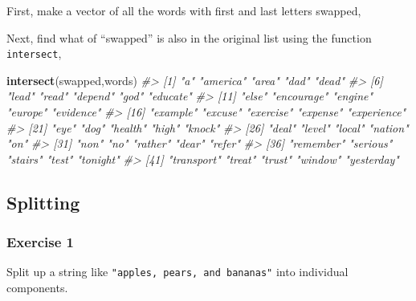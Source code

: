\documentclass[]{book}
\newenvironment{Shaded}{\begin{snugshade}}{\end{snugshade}}
\newcommand{\CharTok}[1]{\textcolor[rgb]{0.31,0.60,0.02}{#1}}
\newcommand{\CommentTok}[1]{\textcolor[rgb]{0.56,0.35,0.01}{\textit{#1}}}
\newcommand{\KeywordTok}[1]{\textcolor[rgb]{0.13,0.29,0.53}{\textbf{#1}}}
\newcommand{\NormalTok}[1]{#1}
\newcommand{\StringTok}[1]{\textcolor[rgb]{0.31,0.60,0.02}{#1}}
\theoremstyle{plain}
\theoremstyle{remark}
\theoremstyle{definition}
\theoremstyle{definition}
\theoremstyle{definition}
\theoremstyle{remark}
\begin{document}
First, make a vector of all the words with first and last letters
swapped,

\begin{Shaded}
\end{Shaded}

Next, find what of ``swapped'' is also in the original list using the
function \texttt{intersect},

\begin{Shaded}
\begin{Highlighting}[]
\KeywordTok{intersect}\NormalTok{(swapped,words)}
\CommentTok{#>  [1] "a"          "america"    "area"       "dad"        "dead"      }
\CommentTok{#>  [6] "lead"       "read"       "depend"     "god"        "educate"   }
\CommentTok{#> [11] "else"       "encourage"  "engine"     "europe"     "evidence"  }
\CommentTok{#> [16] "example"    "excuse"     "exercise"   "expense"    "experience"}
\CommentTok{#> [21] "eye"        "dog"        "health"     "high"       "knock"     }
\CommentTok{#> [26] "deal"       "level"      "local"      "nation"     "on"        }
\CommentTok{#> [31] "non"        "no"         "rather"     "dear"       "refer"     }
\CommentTok{#> [36] "remember"   "serious"    "stairs"     "test"       "tonight"   }
\CommentTok{#> [41] "transport"  "treat"      "trust"      "window"     "yesterday"}
\end{Highlighting}
\end{Shaded}

\hypertarget{splitting}{%
\subsection{Splitting}\label{splitting}}

\hypertarget{exercise-1-40}{%
\subsubsection{Exercise 1}\label{exercise-1-40}}

Split up a string like \texttt{"apples,\ pears,\ and\ bananas"} into
individual components.
\end{document}

